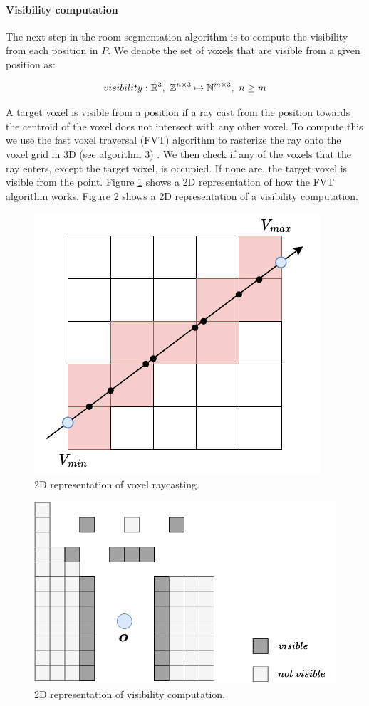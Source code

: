 \paragraph{Visibility computation}
The next step in the room segmentation algorithm is to compute the visibility from each position in \(P\). We denote the set of voxels that are visible from a given position as:

\begin{equation}
    \label{eq:visibility}
    visibility: \mathbb{R}^{3},\ \mathbb{Z}^{n \times 3} \mapsto \mathbb{N}^{m \times 3},\ n \geq m
\end{equation}

A target voxel is visible from a position if a ray cast from the position towards the centroid of the voxel does not intersect with any other voxel. To compute this we use the fast voxel traversal (FVT) algorithm to rasterize the ray onto the voxel grid in 3D (see algorithm 3) \citep{amanatides_fast_1987}. We then check if any of the voxels that the ray enters, except the target voxel, is occupied. If none are, the target voxel is visible from the point. Figure \ref{fig:voxel_raycast} shows a 2D representation of how the FVT algorithm works. Figure \ref{fig:visibility} shows a 2D representation of a visibility computation.

\begin{figure}[h]
    \centering
    \includegraphics*[width=.5\textwidth]{./fig/dda.pdf}
    \caption{2D representation of voxel raycasting.}
    \label{fig:voxel_raycast}

\end{figure}

\begin{figure}[h]
    \centering
    \includegraphics*[width=.7\textwidth]{./fig/visibility.pdf}
    \caption{2D representation of visibility computation.}
    \label{fig:visibility}

\end{figure}

